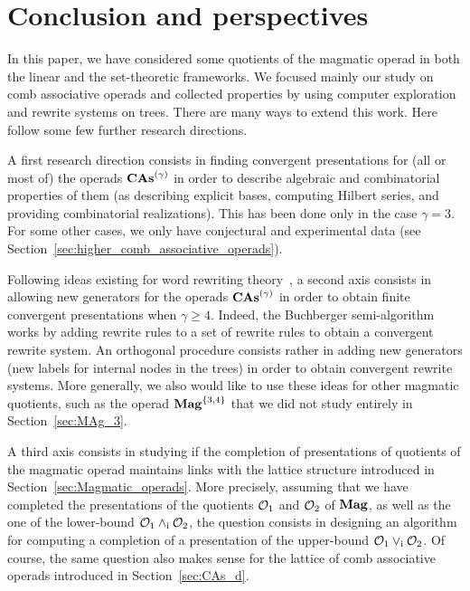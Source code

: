 \section*{Conclusion and perspectives}
In this paper, we have considered some quotients of the magmatic operad
in both the linear and the set-theoretic frameworks. We focused mainly
our study on comb associative operads and collected properties by
using computer exploration and rewrite systems on trees. There are many
ways to extend this work. Here follow some few further research
directions.
\medbreak

A first research direction consists in finding convergent presentations
for (all or most of) the operads $\mathbf{CAs}^{\left(\gamma\right)}$ in
order to describe algebraic and combinatorial properties of them (as
describing explicit bases, computing Hilbert series, and providing
combinatorial realizations). This has been done only in the case
$\gamma = 3$. For some other cases, we only have conjectural and
experimental data (see
Section~\ref{sec:higher_comb_associative_operads}).
\medbreak

Following ideas existing for word rewriting theory~\cite{GGM15}, a
second axis consists in allowing new generators for the operads
$\mathbf{CAs}^{\left(\gamma\right)}$ in order to obtain finite convergent presentations
when $\gamma \geq 4$. Indeed, the Buchberger semi-algorithm works by
adding rewrite rules to a set of rewrite rules to obtain a convergent
rewrite system. An orthogonal procedure consists rather in adding new
generators (new labels for internal nodes in the trees) in order to
obtain convergent rewrite systems. More generally, we also would like to
use these ideas for other magmatic quotients, such as the operad
$\mathbf{Mag}^{\{3, 4\}}$ that we did not study entirely in
Section~\ref{sec:MAg_3}.
\medbreak

A third axis consists in studying if the completion of presentations of
quotients of the magmatic operad maintains links with
the lattice structure introduced in Section~\ref{sec:Magmatic_operads}.
More precisely, assuming that we have completed the presentations of
the quotients $\mathcal{O}_1$ and $\mathcal{O}_2$ of $\mathbf{Mag}$,
as well as the one of the lower-bound $\mathcal{O}_1 \wedge_{\mathrm{i}} \mathcal{O}_2$, the
question consists in designing an algorithm for computing a completion
of a presentation of the upper-bound
$\mathcal{O}_1 \vee_{\mathrm{i}} \mathcal{O}_2$. Of course, the same question also makes sense
for the lattice of comb associative operads introduced in
Section~\ref{sec:CAs_d}.
\medbreak

